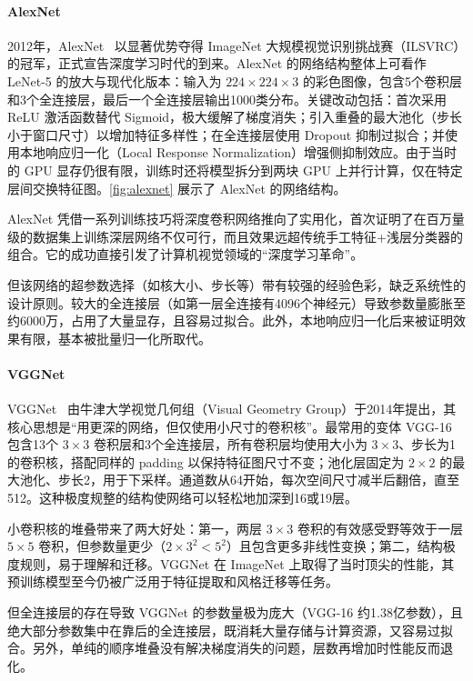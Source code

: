 \paragraph{AlexNet}

2012年，AlexNet~\cite{2012ImageNet} 以显著优势夺得 ImageNet 大规模视觉识别挑战赛（ILSVRC）的冠军，正式宣告深度学习时代的到来。AlexNet 的网络结构整体上可看作 LeNet-5 的放大与现代化版本：输入为 $224\times224\times3$ 的彩色图像，包含5个卷积层和3个全连接层，最后一个全连接层输出1000类分布。关键改动包括：首次采用 ReLU 激活函数替代 Sigmoid，极大缓解了梯度消失；引入重叠的最大池化（步长小于窗口尺寸）以增加特征多样性；在全连接层使用 Dropout 抑制过拟合；并使用本地响应归一化（Local Response Normalization）增强侧抑制效应。由于当时的 GPU 显存仍很有限，训练时还将模型拆分到两块 GPU 上并行计算，仅在特定层间交换特征图。\cref{fig:alexnet} 展示了 AlexNet 的网络结构。

AlexNet 凭借一系列训练技巧将深度卷积网络推向了实用化，首次证明了在百万量级的数据集上训练深层网络不仅可行，而且效果远超传统手工特征+浅层分类器的组合。它的成功直接引发了计算机视觉领域的“深度学习革命”。

但该网络的超参数选择（如核大小、步长等）带有较强的经验色彩，缺乏系统性的设计原则。较大的全连接层（如第一层全连接有4096个神经元）导致参数量膨胀至约6000万，占用了大量显存，且容易过拟合。此外，本地响应归一化后来被证明效果有限，基本被批量归一化所取代。

\paragraph{VGGNet}

VGGNet~\cite{simonyan2015deepconvolutionalnetworkslargescale} 由牛津大学视觉几何组（Visual Geometry Group）于2014年提出，其核心思想是“用更深的网络，但仅使用小尺寸的卷积核”。最常用的变体 VGG-16 包含13个 $3\times3$ 卷积层和3个全连接层，所有卷积层均使用大小为 $3\times3$、步长为1的卷积核，搭配同样的 padding 以保持特征图尺寸不变；池化层固定为 $2\times2$ 的最大池化、步长2，用于下采样。通道数从64开始，每次空间尺寸减半后翻倍，直至512。这种极度规整的结构使网络可以轻松地加深到16或19层。

小卷积核的堆叠带来了两大好处：第一，两层 $3\times3$ 卷积的有效感受野等效于一层 $5\times5$ 卷积，但参数量更少（$2\times 3^2 < 5^2$）且包含更多非线性变换；第二，结构极度规则，易于理解和迁移。VGGNet 在 ImageNet 上取得了当时顶尖的性能，其预训练模型至今仍被广泛用于特征提取和风格迁移等任务。

但全连接层的存在导致 VGGNet 的参数量极为庞大（VGG-16 约1.38亿参数），且绝大部分参数集中在靠后的全连接层，既消耗大量存储与计算资源，又容易过拟合。另外，单纯的顺序堆叠没有解决梯度消失的问题，层数再增加时性能反而退化。

